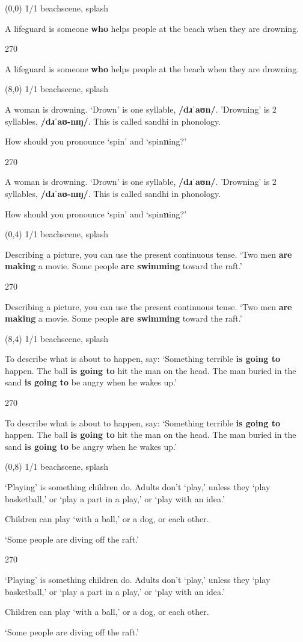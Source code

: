 \documentclass[a4paper]{article}
\newenvironment{itemize*}%
{\begin{itemize}%
 \setlength{\itemsep}{0.0cm}%
 \setlength{\parsep}{0pt}%
 \setlength{\parskip}{0pt}}%
{\end{itemize}}
\newcommand{\mycard}[3]{%
	\small #1 #2
	\par
	\parbox[t][6.8cm][c]{9.5cm}{%
	\par
	\myleft{#3}
	\par
	\myright{#3}
	}
}
\newcommand{\myleft}[1]{%
	\begin{sideways}
	\hspace*{-0.9cm}
		\parbox[t][2.7cm][t]{6.5cm}{%
		\large #1
		}
	\end{sideways}
}
\newcommand{\myright}[1]{%
	\hspace*{6.5cm}
	\begin{turn}{270}
	\hspace*{-7.1cm}
		\parbox[t][2.7cm][t]{6.5cm}{%
		\large #1
		}
	\end{turn}
}
\begin{document}
\begin{textblock}{8}(0,0)
\mycard{1/1}{beachscene, splash}{
\begin{itemize*}
\item A lifeguard is someone \textbf{who} helps people at the beach when they are drowning.
\end{itemize*}
}
\end{textblock}

\begin{textblock}{8}(8,0)
\mycard{1/1}{beachscene, splash}{
\begin{itemize*}
\item A woman is drowning. `Drown' is one syllable, \textbf{/dɹˈaʊn/}. 'Drowning' is 2 syllables, \textbf{/dɹˈaʊ-nɪŋ/}. This is called sandhi in phonology.
\item How should you pronounce `spin' and `spin\textbf{n}ing?'
\end{itemize*}
}
\end{textblock}

\begin{textblock}{8}(0,4)
\mycard{1/1}{beachscene, splash}{
\begin{itemize*}
\item Describing a picture, you can use the present continuous tense. `Two men \textbf{are making} a movie. Some people \textbf{are swimming} toward the raft.'
\end{itemize*}
}
\end{textblock}

\begin{textblock}{8}(8,4)
\mycard{1/1}{beachscene, splash}{
\begin{itemize*}
\item To describe what is about to happen, say: `Something terrible \textbf{is going to} happen. The ball \textbf{is going to} hit the man on the head. The man buried in the sand \textbf{is going to} be angry when he wakes up.'
\end{itemize*}
}
\end{textblock}

\begin{textblock}{8}(0,8)
\mycard{1/1}{beachscene, splash}{
\begin{itemize*}
\item `Playing' is something children do. Adults don't `play,' unless they `play basketball,' or `play a part in a play,' or `play with an idea.'
\item Children can play `with a ball,' or a dog, or each other. 
\item `Some people are diving off the raft.'
\end{itemize*}
}
\end{textblock}
\end{document}
